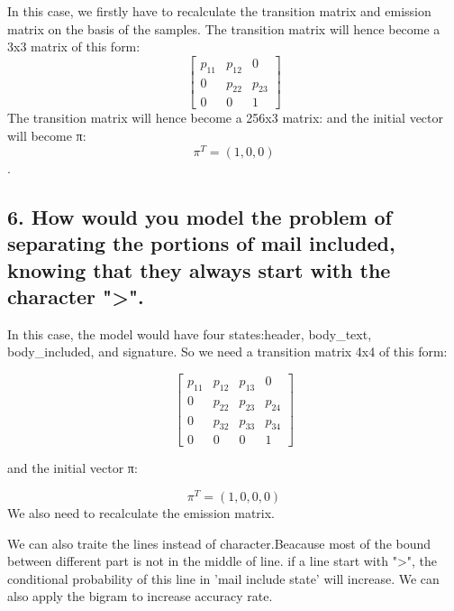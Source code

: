 \documentclass[11pt]{article}
\begin{document}
In this case, we firstly have to recalculate the transition matrix and
emission matrix on the basis of the samples. The transition matrix will
hence become a 3x3 matrix of this form: \[ \begin{bmatrix}
    p_{11}       & p_{12} & 0 \\
     0       & p_{22} & p_{23} \\
     0       & 0 & 1
 \end{bmatrix} \] The transition matrix will hence become a 256x3
matrix: and the initial vector will become π: \[π^{T} = (1, 0, 0)\].

    \subsection{6. How would you model the problem of separating the
portions of mail included, knowing that they always start with the
character
"\textgreater{}".}\label{how-would-you-model-the-problem-of-separating-the-portions-of-mail-included-knowing-that-they-always-start-with-the-character-.}

In this case, the model would have four states:header, body\_text,
body\_included, and signature. So we need a transition matrix 4x4 of
this form:

\[ \begin{bmatrix}
    p_{11}       & p_{12} & p_{13} & 0 \\
     0       & p_{22} & p_{23} & p_{24} \\
     0       & p_{32} & p_{33} & p_{34} \\
     0       & 0 & 0 & 1
 \end{bmatrix} \]

and the initial vector π:

\[π^{T} = (1, 0, 0, 0)\] We also need to recalculate the emission
matrix.

We can also traite the lines instead of character.Beacause most of the
bound between different part is not in the middle of line. if a line
start with "\textgreater{}", the conditional probability of this line in
'mail include state' will increase. We can also apply the bigram to
increase accuracy rate.


    
    
    
    
\end{document}
